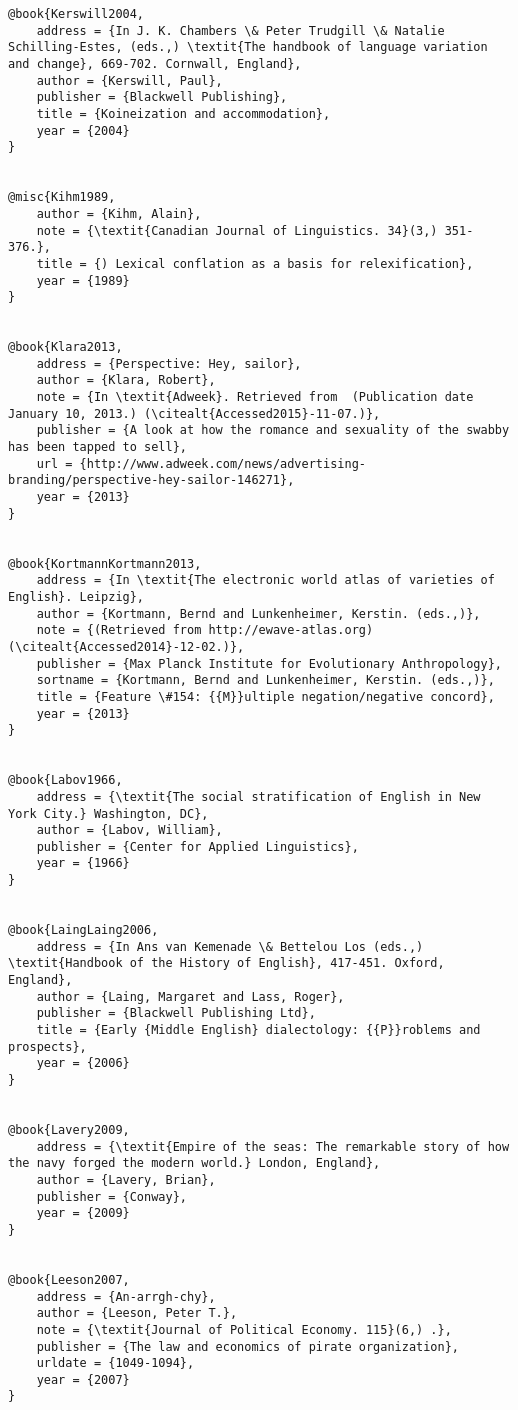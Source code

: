 \begin{verbatim}
@book{Kerswill2004,
	address = {In J. K. Chambers \& Peter Trudgill \& Natalie Schilling-Estes, (eds.,) \textit{The handbook of language variation and change}, 669-702. Cornwall, England},
	author = {Kerswill, Paul},
	publisher = {Blackwell Publishing},
	title = {Koineization and accommodation},
	year = {2004}
}


@misc{Kihm1989,
	author = {Kihm, Alain},
	note = {\textit{Canadian Journal of Linguistics. 34}(3,) 351-376.},
	title = {) Lexical conflation as a basis for relexification},
	year = {1989}
}


@book{Klara2013,
	address = {Perspective: Hey, sailor},
	author = {Klara, Robert},
	note = {In \textit{Adweek}. Retrieved from  (Publication date January 10, 2013.) (\citealt{Accessed2015}-11-07.)},
	publisher = {A look at how the romance and sexuality of the swabby has been tapped to sell},
	url = {http://www.adweek.com/news/advertising-branding/perspective-hey-sailor-146271},
	year = {2013}
}


@book{KortmannKortmann2013,
	address = {In \textit{The electronic world atlas of varieties of English}. Leipzig},
	author = {Kortmann, Bernd and Lunkenheimer, Kerstin. (eds.,)},
	note = {(Retrieved from http://ewave-atlas.org) (\citealt{Accessed2014}-12-02.)},
	publisher = {Max Planck Institute for Evolutionary Anthropology},
	sortname = {Kortmann, Bernd and Lunkenheimer, Kerstin. (eds.,)},
	title = {Feature \#154: {{M}}ultiple negation/negative concord},
	year = {2013}
}


@book{Labov1966,
	address = {\textit{The social stratification of English in New York City.} Washington, DC},
	author = {Labov, William},
	publisher = {Center for Applied Linguistics},
	year = {1966}
}


@book{LaingLaing2006,
	address = {In Ans van Kemenade \& Bettelou Los (eds.,) \textit{Handbook of the History of English}, 417-451. Oxford, England},
	author = {Laing, Margaret and Lass, Roger},
	publisher = {Blackwell Publishing Ltd},
	title = {Early {Middle English} dialectology: {{P}}roblems and prospects},
	year = {2006}
}


@book{Lavery2009,
	address = {\textit{Empire of the seas: The remarkable story of how the navy forged the modern world.} London, England},
	author = {Lavery, Brian},
	publisher = {Conway},
	year = {2009}
}


@book{Leeson2007,
	address = {An-arrgh-chy},
	author = {Leeson, Peter T.},
	note = {\textit{Journal of Political Economy. 115}(6,) .},
	publisher = {The law and economics of pirate organization},
	urldate = {1049-1094},
	year = {2007}
}



\end{verbatim}
